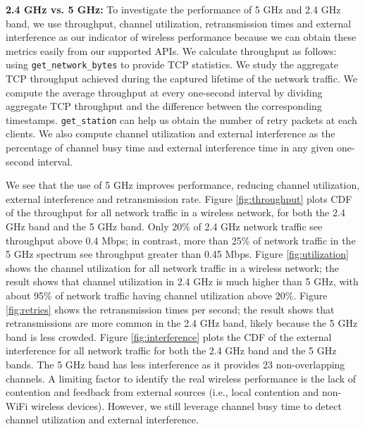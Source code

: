 \textbf{2.4 GHz vs. 5 GHz:} To investigate the performance of 5 GHz and 2.4 GHz band, we use throughput, channel utilization, retransmission times and external interference as our indicator of wireless performance because we can obtain these metrics easily from our supported APIs. We calculate throughput as follows: using \texttt{get\_network\_bytes} to provide TCP statistics. We study the aggregate TCP throughput achieved during the captured lifetime of the network traffic. We compute the average throughput at every one-second interval by dividing aggregate TCP throughput and the difference between the corresponding timestamps. \texttt{get\_station} can help us obtain the number of retry packets at each clients. We also compute channel utilization and external interference as the percentage of channel busy time and external interference time in any given one-second interval. 

We see that the use of 5 GHz improves performance, reducing channel utilization, external interference and retransmission rate. Figure \ref{fig:throughput} plots CDF of the throughput for all network traffic in a wireless network, for both the 2.4 GHz band and the 5 GHz band. Only 20\% of 2.4 GHz network traffic see throughput above 0.4 Mbps; in contrast, more than 25\% of network traffic in the 5 GHz spectrum see throughput greater than 0.45 Mbps. Figure \ref{fig:utilization} shows the channel utilization for all network traffic in a wireless network; the result shows that channel utilization in 2.4 GHz is much higher than 5 GHz, with about 95\% of network traffic having channel utilization above 20\%. Figure \ref{fig:retries} shows the retransmission times per second; the result shows that retransmissions are more common in the 2.4 GHz band, likely because the 5 GHz band is less crowded. Figure \ref{fig:interference} plots the CDF of the external interference for all network traffic for both the 2.4 GHz band and the 5 GHz bands. The 5 GHz band has less interference as it provides 23 non-overlapping channels. A limiting factor to identify the real wireless performance is the lack of contention and feedback from external sources (i.e., local contention and non-WiFi wireless devices). However, we still leverage channel busy time to detect channel utilization and external interference.

